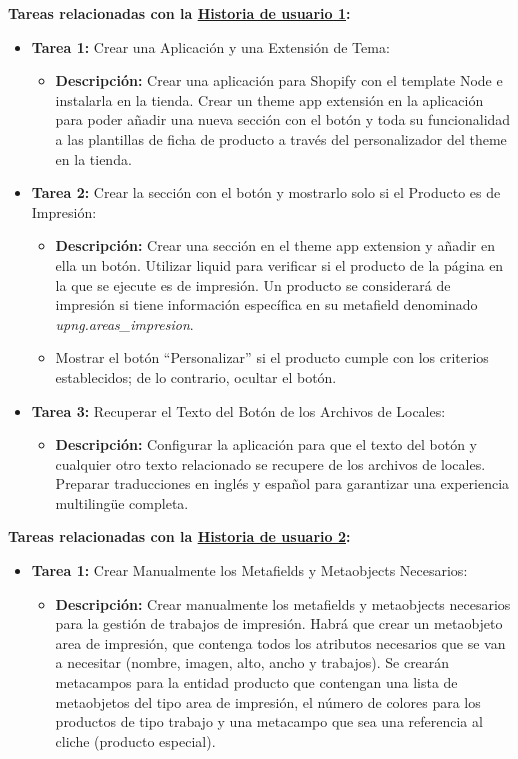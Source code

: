 \documentclass[12pt]{article}
\begin{document}
\textbf{Tareas relacionadas con la \hyperref[sec:historia1]{Historia de usuario 1}:}
\begin{itemize}
    \item \textbf{Tarea 1:} Crear una Aplicación y una Extensión de Tema:
          \begin{itemize}[label=--]
              \item \textbf{Descripción:} Crear una aplicación para Shopify con el template Node e instalarla en la tienda. Crear un theme app extensión en la aplicación para poder añadir una nueva sección con el botón y toda su funcionalidad a las plantillas de ficha de producto a través del personalizador del theme en la tienda.
          \end{itemize}
    \item \textbf{Tarea 2:} Crear la sección con el botón y mostrarlo solo si el Producto es de Impresión:
          \begin{itemize}[label=--]
              \item \textbf{Descripción:} Crear una sección en el theme app extension y añadir en ella un botón. Utilizar liquid para verificar si el producto de la página en la que se ejecute es de impresión. Un producto se considerará de impresión si tiene información específica en su metafield denominado \textit{upng.areas\_impresion}.
              \item Mostrar el botón ``Personalizar'' si el producto cumple con los criterios establecidos; de lo contrario, ocultar el botón.
          \end{itemize}
    \item \textbf{Tarea 3:} Recuperar el Texto del Botón de los Archivos de Locales:
          \begin{itemize}[label=--]
              \item \textbf{Descripción:} Configurar la aplicación para que el texto del botón y cualquier otro texto relacionado se recupere de los archivos de locales. Preparar traducciones en inglés y español para garantizar una experiencia multilingüe completa.
          \end{itemize}
\end{itemize}

\textbf{Tareas relacionadas con la \hyperref[sec:historia2]{Historia de usuario 2}:}
\begin{itemize}
    \item \textbf{Tarea 1:} Crear Manualmente los Metafields y Metaobjects Necesarios:
          \begin{itemize}[label=--]
              \item \textbf{Descripción:} Crear manualmente los metafields y metaobjects necesarios para la gestión de trabajos de impresión. Habrá que crear un metaobjeto area de impresión, que contenga todos los atributos necesarios que se van a necesitar (nombre, imagen, alto, ancho y trabajos). Se crearán metacampos para la entidad producto que contengan una lista de metaobjetos del tipo area de impresión, el número de colores para los productos de tipo trabajo y una metacampo que sea una referencia al cliche (producto especial).
          \end{itemize}
\end{itemize}
\end{document}
